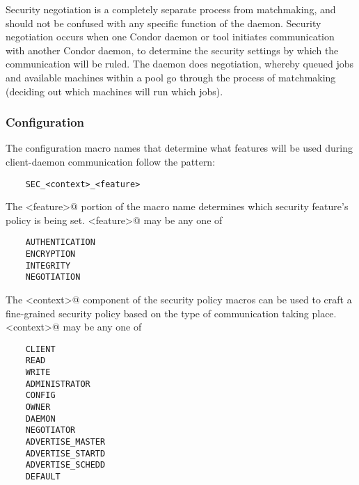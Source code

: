 
Security negotiation is a completely separate process from
matchmaking, and should not be confused with any specific function of
the  daemon. 
Security negotiation occurs when one
Condor daemon or tool initiates communication with another Condor daemon,
to determine the security settings by which the communication will
be ruled.
The  daemon does negotiation,
whereby queued jobs and available machines within a pool
go through the process of matchmaking (deciding out which
machines will run which jobs).

\subsubsection{\label{sec:security-negotiation-features}Configuration}

The configuration macro names that determine what features will be used during
client-daemon communication follow the pattern:
\begin{verbatim}
    SEC_<context>_<feature>
\end{verbatim}

The \verb@<feature>@
portion of the macro name determines which security feature's
policy is being set.
\verb@<feature>@ may be any one of
\begin{verbatim}
    AUTHENTICATION
    ENCRYPTION
    INTEGRITY
    NEGOTIATION
\end{verbatim}

The \verb@<context>@ component of the security policy macros can be
used to craft a fine-grained security policy based on the type of
communication taking place.
\verb@<context>@ may be any one of
\begin{verbatim}
    CLIENT
    READ
    WRITE
    ADMINISTRATOR
    CONFIG
    OWNER
    DAEMON
    NEGOTIATOR
    ADVERTISE_MASTER
    ADVERTISE_STARTD
    ADVERTISE_SCHEDD
    DEFAULT
\end{verbatim}

